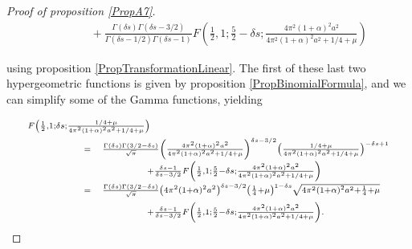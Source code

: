 \documentclass{jams-l}
\theoremstyle{definition}
\theoremstyle{remark}
\numberwithin{equation}{section}
\begin{document}
\begin{proof}[Proof of proposition \ref{PropA7}]
\[\begin{array}{lll}
                            && \qquad \scriptstyle + \frac{\Gamma \left( \delta s \right) \Gamma \left( \delta s - 3/2 \right)}{\Gamma \left( \delta s - 1/2 \right) \Gamma \left( \delta s - 1 \right)} F \left( \frac{1}{2}, 1; \frac{5}{2} - \delta s; \frac{4 \pi^2 \left( 1 + \alpha \right)^2 a^2}{4 \pi^2 \left( 1 + \alpha \right)^2 a^2 + 1/4 + \mu} \right)
                        \end{array} \]
                    
                    \noindent using proposition \ref{PropTransformationLinear}. The first of these last two hypergeometric functions is given by proposition \ref{PropBinomialFormula}, and we can simplify some of the Gamma functions, yielding
                    
                    \[ \begin{array}{lll}
                            \multicolumn{3}{l}{\scriptstyle F \left( \frac{1}{2}, 1; \delta s; \frac{1/4 + \mu}{4 \pi^2 \left( 1 + \alpha \right)^2 a^2 + 1/4 + \mu} \right)} \\[0.5em]
                            
                            \qquad \qquad & \scriptstyle = & \scriptstyle \frac{\Gamma \left( \delta s \right) \Gamma \left( 3/2 - \delta s \right)}{\sqrt{\pi}} \left( \frac{4 \pi^2 \left( 1 + \alpha \right)^2 a^2}{4 \pi^2 \left( 1 + \alpha \right)^2 a^2 + 1/4 + \mu} \right)^{\delta s - 3/2} \left( \frac{1/4 + \mu}{4 \pi^2 \left( 1 + \alpha \right)^2 a^2 + 1/4 + \mu} \right)^{- \delta s + 1} \\[0.5em]
                            
                            && \qquad \qquad \scriptstyle + \frac{\delta s - 1}{\delta s - 3/2} F \left( \frac{1}{2}, 1; \frac{5}{2} - \delta s; \frac{4 \pi^2 \left( 1 + \alpha \right)^2 a^2}{4 \pi^2 \left( 1 + \alpha \right)^2 a^2 + 1/4 + \mu} \right) \\[0.5em]
                            
                            & \scriptstyle = & \scriptstyle \frac{\Gamma \left( \delta s \right) \Gamma \left( 3/2 - \delta s \right)}{\sqrt{\pi}} \left( 4 \pi^2 \left( 1 + \alpha \right)^2 a^2 \right)^{\delta s - 3/2} \left( \frac{1}{4} + \mu \right)^{1 - \delta s} \sqrt{4 \pi^2 \left( 1 + \alpha \right)^2 a^2 + \frac{1}{4} + \mu} \\[0.5em]
                            
                            && \qquad \qquad \scriptstyle + \frac{\delta s - 1}{\delta s - 3/2} F \left( \frac{1}{2}, 1; \frac{5}{2} - \delta s; \frac{4 \pi^2 \left( 1 + \alpha \right)^2 a^2}{4 \pi^2 \left( 1 + \alpha \right)^2 a^2 + 1/4 + \mu} \right).
                        \end{array} \]
                    

\end{proof}
\end{document}

